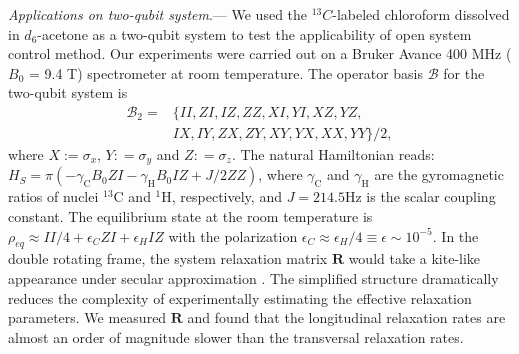 \documentclass[prl,aps,twocolumn, reprint, amsmath,amssymb,showpacs,superscriptaddress]{revtex4}
\begin{document}
\emph{Applications on two-qubit system}.---
We used the $^{13}C$-labeled chloroform dissolved in $d_6$-acetone as a two-qubit system to test the applicability of open system control method. Our experiments were carried out on a Bruker Avance \uppercase\expandafter{} 400 MHz ($B_0$ = 9.4 T) spectrometer at room temperature. The operator basis $\mathcal{B}$ for the two-qubit system is
\begin{align}
\mathcal{B}_2 = & \{ II,ZI,IZ,ZZ,XI,YI,XZ,YZ,   \nonumber \\
& IX,IY,ZX,ZY,XY,YX,XX,YY \} /2,   \nonumber
\end{align}
where $X := \sigma_x$, $Y : = \sigma_y$ and $Z : = \sigma_z$. The natural Hamiltonian reads: $H_S = \pi ( - \gamma_\text{C} B_0 ZI -  \gamma_\text{H} B_0 IZ+ J/2 ZZ)$,
where $\gamma_\text{C}$ and $\gamma_\text{H}$ are the gyromagnetic ratios of nuclei $^{13}$C and $^{1}$H, respectively, and $J = 214.5$Hz is the scalar coupling constant.
The equilibrium state at the room temperature is $\rho_{eq} \approx II/4 + \epsilon_C ZI + \epsilon_H IZ$ with the polarization $ \epsilon_C \approx \epsilon_H/4  \equiv  \epsilon  \sim 10 ^{-5}$.
In the double rotating frame, the system relaxation matrix $\mathbf{R}$ would take a kite-like appearance under secular approximation \cite{KM}.
The simplified structure dramatically reduces the complexity of experimentally estimating the effective relaxation parameters. We measured $\mathbf{R}$ \cite{S2} and found that the longitudinal relaxation rates are almost an order of magnitude slower than the transversal relaxation rates.
\end{document}

